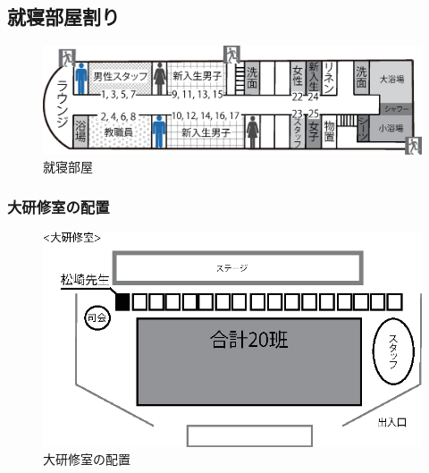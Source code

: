 \subsection{就寝部屋割り}
\begin{figure}[H]
\begin{center}
\includegraphics[scale=0.6]{./10/syushin.eps}
\caption{就寝部屋}
\label{fig:shushin}
\end{center}
\end{figure}

\subsubsection{大研修室の配置}
\begin{figure}[H]
 \begin{center}
  \includegraphics[width=130mm]{./03/nyushoshiki.eps}
  \end{center}
 \caption{大研修室の配置}
 \label{fig:daikenshuhaichi}
\end{figure}

\newpage
\newpage
